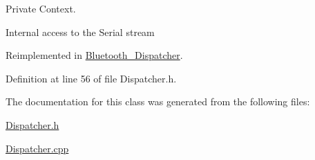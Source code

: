 \-Private \-Context. 

\-Internal access to the \-Serial stream 

\-Reimplemented in \hyperlink{class_bluetooth___dispatcher_a9b30fd1951f4e064a707ec75b941d18e}{\-Bluetooth\-\_\-\-Dispatcher}.



\-Definition at line 56 of file \-Dispatcher.\-h.



\-The documentation for this class was generated from the following files\-:\begin{DoxyCompactItemize}
\item 
\hyperlink{_dispatcher_8h}{\-Dispatcher.\-h}\item 
\hyperlink{_dispatcher_8cpp}{\-Dispatcher.\-cpp}\end{DoxyCompactItemize}
